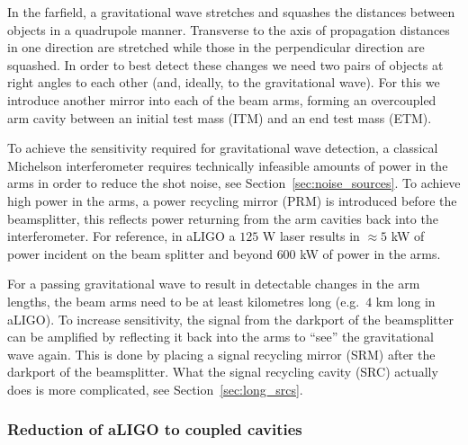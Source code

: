\documentclass[aps,pra,superscriptaddress,reprint,nofootinbib]{revtex4-1}
\begin{document}
In the farfield, a gravitational wave stretches and squashes the distances between objects in a quadrupole manner. Transverse to the axis of propagation distances in one direction are stretched while those in the perpendicular direction are squashed. In order to best detect these changes we need two pairs of objects at right angles to each other (and, ideally, to the gravitational wave). For this we introduce another mirror into each of the beam arms, forming an overcoupled arm cavity between an initial test mass (ITM) and an end test mass (ETM).


To achieve the sensitivity required for gravitational wave detection, a classical Michelson interferometer requires technically infeasible amounts of power in the arms in order to reduce the shot noise, see Section~\ref{sec:noise_sources}.
To achieve high power in the arms, a power recycling mirror (PRM) is introduced before the beamsplitter, this reflects power returning from the arm cavities back into the interferometer. For reference, in aLIGO a $125$ W laser results in $\approx 5$ kW of power incident on the beam splitter and beyond $600$ kW of power in the arms.


For a passing gravitational wave to result in detectable changes in the arm lengths, the beam arms need to be at least kilometres long (e.g.\ $4$ km long in aLIGO). To increase sensitivity, the signal from the darkport of the beamsplitter can be amplified by reflecting it back into the arms to ``see'' the gravitational wave again. This is done by placing a signal recycling mirror (SRM) after the darkport of the beamsplitter. What the signal recycling cavity (SRC) actually does is more complicated, see Section~\ref{sec:long_srcs}.


\subsubsection{Reduction of aLIGO to coupled cavities}
\end{document}
